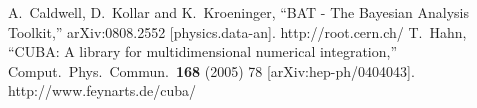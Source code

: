 \documentclass[11pt, a4paper]{article}
\begin{document}










\begin{thebibliography}{99}
  A.~Caldwell, D.~Kollar and K.~Kroeninger,
  ``BAT - The Bayesian Analysis Toolkit,''
  arXiv:0808.2552 [physics.data-an].
%
http://root.cern.ch/
%
  T.~Hahn, ``CUBA: A library for multidimensional numerical
  integration,'' Comput.\ Phys.\ Commun.\ {\bf 168} (2005) 78
  [arXiv:hep-ph/0404043].
%
  http://www.feynarts.de/cuba/
\end{thebibliography}

\end{document}
